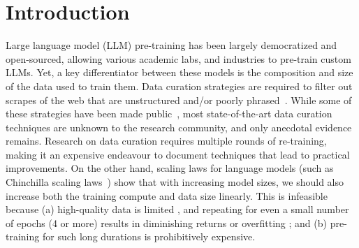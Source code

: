 \section{Introduction}
\label{sec:intoduction}
Large language model (LLM) pre-training has been largely democratized and open-sourced, allowing various academic labs, and industries to pre-train custom LLMs. 
Yet, a key differentiator between these models is the composition and size of the data used to train them. 
Data curation strategies are required to filter out scrapes of the web that are unstructured and/or poorly phrased~\citep{eisenstein-2013-bad}.
While some of these strategies have been made public~\citep{brown2020language,wenzek-etal-2020-ccnet,penedo2023refinedweb}, most state-of-the-art data curation techniques are unknown to the research community, and only anecdotal evidence remains. Research on data curation requires multiple rounds of re-training, making it an expensive endeavour to document techniques that lead to practical improvements.
On the other hand, scaling laws for language models (such as Chinchilla scaling laws~\citep{hoffmann2022training}) show that with increasing model sizes, we should also increase both the training compute and data size linearly.  This is infeasible because (a) high-quality data is limited \citep{villalobos2022will}, and repeating for even a small number of epochs (4 or more) results in diminishing returns or overfitting \citep{muennighoff2023scaling,touvron2023llama,xue2023repeat}; and (b) pre-training for such long durations is prohibitively expensive. 

